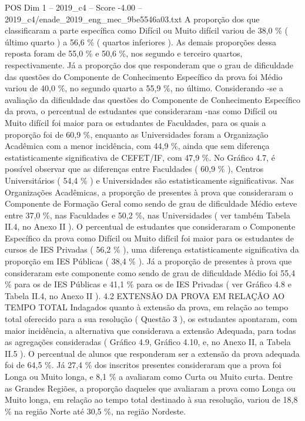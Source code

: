 \begin{textsample}{POS Dim 1 – 2019\_c4 – Score -4.00 – 2019\_c4/enade\_2019\_eng\_mec\_9be5546a03.txt}
A proporção dos que classificaram a parte específica como Difícil ou Muito difícil variou de 38,0 \% ( último quarto ) a 56,6 \% ( quartos inferiores ).
As demais proporções dessa reposta foram de 55,0 \% e 50,6 \%, nos segundo e terceiro quartos, respectivamente.
Já a proporção dos que responderam que o grau de dificuldade das questões do Componente de Conhecimento Específico da prova foi Médio variou de 40,0 \%, no segundo quarto a 55,9 \%, no último.
Considerando -se a avaliação da dificuldade das questões do Componente de Conhecimento Específico da prova, o percentual de estudantes que consideraram -nas como Difícil ou Muito difícil foi maior para os estudantes de Faculdades, para os quais a proporção foi de 60,9 \%, enquanto as Universidades foram a Organização Acadêmica com a menor incidência, com 44,9 \%, ainda que sem diferença estatisticamente significativa de CEFET/IF, com 47,9 \%.
No Gráfico 4.7, é possível observar que as diferenças entre Faculdades ( 60,9 \% ), Centros Universitários ( 54,4 \% ) e Universidades são estatisticamente significativas.
Nas Organizações Acadêmicas, a proporção de presentes à prova que consideraram o Componente de Formação Geral como sendo de grau de dificuldade Médio esteve entre 37,0 \%, nas Faculdades e 50,2 \%, nas Universidades ( ver também Tabela II.4, no Anexo II ).
O percentual de estudantes que consideraram o Componente Específico da prova como Difícil ou Muito difícil foi maior para os estudantes de cursos de IES Privadas ( 56,2 \% ), uma diferença estatisticamente significativa da proporção em IES Públicas ( 38,4 \% ).
Já a proporção de presentes à prova que consideraram este componente como sendo de grau de dificuldade Médio foi 55,4 \% para os de IES Públicas e 41,1 \% para os de IES Privadas ( ver Gráfico 4.8 e Tabela II.4, no Anexo II ). 4.2 EXTENSÃO DA PROVA EM RELAÇÃO AO TEMPO TOTAL Indagados quanto à extensão da prova, em relação ao tempo total oferecido para a sua resolução ( Questão 3 ), os estudantes apontaram, com maior incidência, a alternativa que considerava a extensão Adequada, para todas as agregações consideradas ( Gráfico 4.9, Gráfico 4.10, e, no Anexo II, a Tabela II.5 ).
O percentual de alunos que responderam ser a extensão da prova adequada foi de 64,5 \%.
Já 27,4 \% dos inscritos presentes consideraram que a prova foi Longa ou Muito longa, e 8,1 \% a avaliaram como Curta ou Muito curta.
Dentre as Grandes Regiões, a proporção daqueles que avaliaram a prova como Longa ou Muito longa, em relação ao tempo total destinado à sua resolução, variou de 18,8 \% na região Norte até 30,5 \%, na região Nordeste.

\end{textsample}
